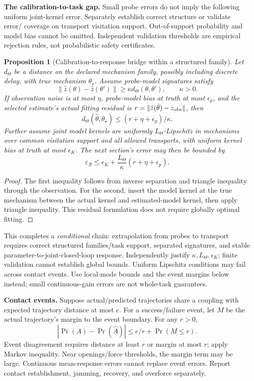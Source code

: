 \documentclass[11pt]{article}
\newtheorem{proposition}{Proposition}[section]
\begin{document}
\textbf{The calibration-to-task gap.} Small probe errors do not imply the following
uniform joint-kernel error. Separately establish correct structure or validate error/
coverage on transport visitation support. Out-of-support probability and model bias
cannot be omitted. Independent validation thresholds are empirical rejection rules,
not probabilistic safety certificates.

\begin{proposition}[Calibration-to-response bridge within a structured family]
Let $d_\Theta$ be a distance on the declared mechanism family, possibly including
discrete delay, with true mechanism $\theta_\star$. Assume probe-model signatures satisfy
\[
 \|\hat z(\theta)-\hat z(\theta')\|\ge\kappa d_\Theta(\theta,\theta'),\qquad \kappa>0.
\]
If observation noise is at most $\eta$, probe-model bias at truth at most $\epsilon_p$,
and the selected estimate's actual fitting residual is
$r=\|\hat z(\hat\theta)-z_{\rm obs}\|$, then
\[
 d_\Theta(\hat\theta,\theta_\star)\le(r+\eta+\epsilon_p)/\kappa.
\]
Further assume joint model kernels are uniformly $L_\Theta$-Lipschitz in mechanisms
over common visitation support and all allowed transports, with uniform kernel bias
at truth at most $\epsilon_K$. The next section's error may then be bounded by
\[
 \varepsilon_{\mathcal B}\le\epsilon_K+\frac{L_\Theta}{\kappa}(r+\eta+\epsilon_p).
\]
\end{proposition}
\begin{proof}
The first inequality follows from inverse separation and triangle inequality through
the observation. For the second, insert the model kernel at the true mechanism between
the actual kernel and estimated-model kernel, then apply triangle inequality. This
residual formulation does not require globally optimal fitting.
\end{proof}
This completes a \emph{conditional} chain: extrapolation from probes to transport
requires correct structured families/task support, separated signatures, and stable
parameter-to-joint-closed-loop response. Independently justify $\kappa,L_\Theta,\epsilon_K$;
finite validation cannot establish global bounds. Uniform Lipschitz conditions may
fail across contact events. Use local-mode bounds and the event margins below instead;
small continuous-gain errors are not whole-task guarantees.

\textbf{Contact events.} Suppose actual/predicted trajectories share a coupling with
expected trajectory distance at most $e$. For a success/failure event, let $M$ be
the actual trajectory's margin to the event boundary. For any $r>0$,
\begin{equation}
 |\Pr(A)-\Pr(\hat A)|\le e/r+\Pr(M\le r).
\end{equation}
Event disagreement requires distance at least $r$ or margin at most $r$; apply Markov
inequality. Near openings/force thresholds, the margin term may be large. Continuous
mean-response errors cannot replace event errors. Report contact establishment,
jamming, recovery, and overforce separately.
\end{document}
